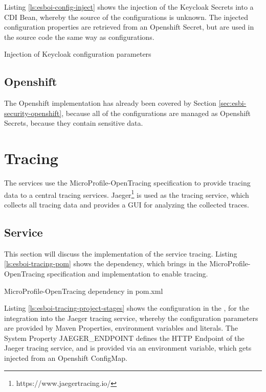 Listing \vref{ls:esboi-config-inject} shows the injection of the Keycloak Secrets into a CDI Bean, whereby the source of the configurations is unknown. The injected configuration properties are retrieved from an Openshift Secret, but are used in the source code the same way as configurations.

\begin{listing}[h]
	\caption{Injection of Keycloak configuration parameters}
	\label{ls:esboi-config-inject}
\end{listing}

\subsection{Openshift}
\label{sec:esbi-config-openshift}
The Openshift implementation has already been covered by Section \vref{sec:esbi-security-openshift}, because all of the configurations are managed as Openshift Secrets, because they contain sensitive data. 

\section{Tracing}
\label{sec:esbi-tracing}
The services use the MicroProfile-OpenTracing specification to provide tracing data to a central tracing services. Jaeger\footnote{https://www.jaegertracing.io/} is used as the tracing service, which collects all tracing data and provides a GUI for analyzing the collected traces. 

\subsection{Service}
\label{sec:esbi-tracing-service}
This section will discuss the implementation of the service tracing. Listing \vref{ls:esboi-tracing-pom} shows the dependency, which brings in the MicroProfile-OpenTracing specification and implementation to enable tracing. 

\begin{listing}[h]
	\caption{MicroProfile-OpenTracing dependency in pom.xml}
	\label{ls:esboi-tracing-pom}
\end{listing}

Listing \vref{ls:esboi-tracing-project-stages} shows the configuration  in the , for the integration into the Jaeger tracing service, whereby the configuration parameters are provided by Maven Properties, environment variables and literals. The System Property JAEGER\_ENDPOINT defines the HTTP Endpoint of the Jaeger tracing service, and is provided via an environment variable, which gets injected from an Openshift ConfigMap.

